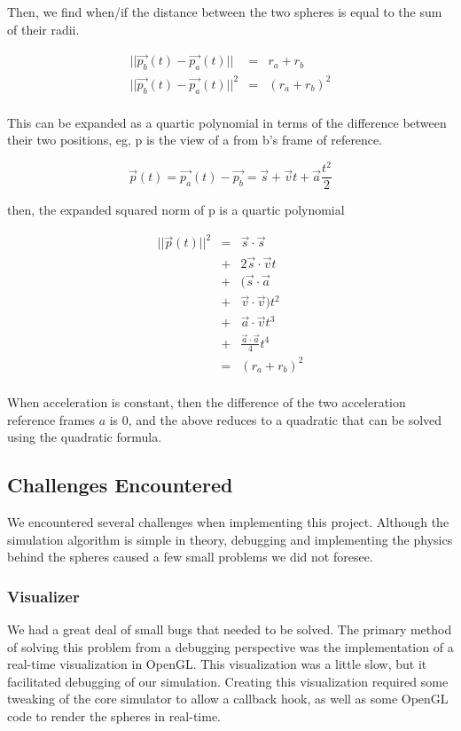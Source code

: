 \documentclass[conference]{IEEEtran}
\begin{document}
Then, we find when/if the distance between the two spheres is equal to the sum of their radii.  

\begin{eqnarray*}
|| \vec{p_b}(t)-\vec{p_a}(t) ||&=&r_a+r_b \\
|| \vec{p_b}(t)-\vec{p_a}(t) || ^ 2&=&(r_a+r_b) ^ 2 \\
\end{eqnarray*}

This can be expanded as a quartic polynomial in terms of the difference between their two positions, eg, p is the view of a from b's frame of reference.
  
\begin{equation}
\vec{p}(t)=\vec{p_a}(t)-\vec{p_b}=\vec{s}+\vec{v} t+\vec{a} \frac{t ^ 2}{2}
\end{equation}

then, the expanded squared norm of p is a quartic polynomial

\begin{eqnarray*}
	|| \vec{p}(t) || ^ 2 &=&\vec{s} \cdot \vec{s} \\
	&+&2 \vec{s} \cdot \vec{v} t \\
	&+& (\vec{s} \cdot \vec{a} \\ 
	&+&  \vec{v} \cdot \vec{v}) t ^ 2 \\
	&+& \vec{a} \cdot \vec{v} t ^ 3 \\
	&+& \frac{\vec{a} \cdot \vec{a}}{4} t ^ 4 \\
	&=& (r_a+r_b) ^ 2 \\
\end{eqnarray*}

When acceleration is constant, then the difference of the two acceleration reference frames $a$ is 0, and the above reduces to a quadratic that can be solved using the quadratic formula.


\subsection{Challenges Encountered}
We encountered several challenges when implementing this project.  Although the simulation algorithm is simple in theory, debugging and implementing the physics behind the spheres caused a few small problems we did not foresee.

\subsubsection{Visualizer}
We had a great deal of small bugs that needed to be solved.  The primary method of solving this problem from a debugging perspective was the implementation of a real-time visualization in OpenGL.
This visualization was a little slow, but it facilitated debugging of our simulation.  Creating this visualization required some tweaking of the core simulator to allow a callback hook, as well as some OpenGL code to render the spheres in real-time.
\end{document}
